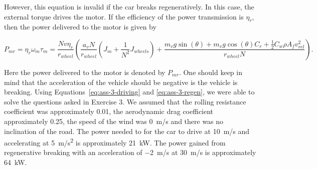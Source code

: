 \documentclass[11pt,titlepage]{report}
\begin{document}
However, this equation is invalid if the car breaks regeneratively. In this case, the external torque drives the motor. If the efficiency of the power transmission is $\eta_r$, then the power delivered to the motor is given by

\begin{equation} \label{eq:ass-3-regen}
	P_{mr} = \eta_r \omega_m \tau_{m} =
	\frac{N v \eta_r}{r_{wheel}} \left(
		\frac{a_v N}{r_{wheel}} (J_m + \frac{1}{N^2} J_{wheels}) + \frac{
			m_v g \sin{(\theta)} +
			m_v g \cos{(\theta)} C_r +
			\frac{1}{2} C_w \rho A_f v_{rel}^2
		}{r_{wheel} N}
	\right).
\end{equation}

Here the power delivered to the motor is denoted by $P_{mr}$. One should keep in mind that the acceleration of the vehicle should be negative is the vehicle is breaking. Using Equations~\ref{eq:ass-3-driving} and \ref{eq:ass-3-regen}, we were able to solve the questions asked in Exercise 3. We assumed that the rolling resistance coefficient was approximately \num{0.01}, the aerodynamic drag coefficient approximately \num{0.25}, the speed of the wind was \SI{0}{m/s} and there was no inclination of the road. The power needed to for the car to drive at \SI{10}{m/s} and accelerating at \SI{5}{m/s^2} is approximately \SI{21}{kW}. The power gained from regenerative breaking with an acceleration of \SI{-2}{m/s} at \SI{30}{m/s} is approximately \SI{64}{kW}.
\end{document}
